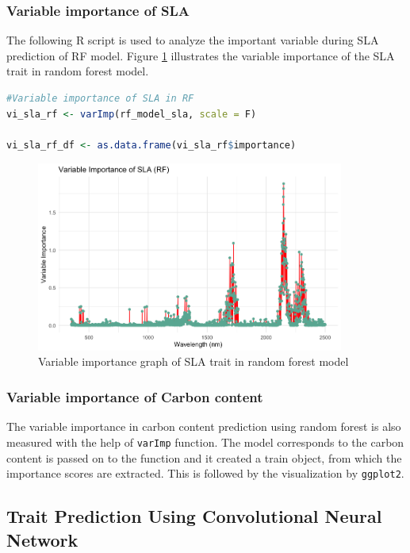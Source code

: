 \documentclass[12pt,a4paper]{report}
\begin{document}
\subsubsection*{Variable importance of SLA}
The following R script is used to analyze the important variable during SLA prediction of RF model. Figure \ref{fig:vi_sla_rf} illustrates the variable importance of the SLA trait in random forest model. \\

\begin{lstlisting}[language=R, style=mystyle]
#Variable importance of SLA in RF
vi_sla_rf <- varImp(rf_model_sla, scale = F)

vi_sla_rf_df <- as.data.frame(vi_sla_rf$importance)
\end{lstlisting}

\begin{figure}[h]
    \centering
    \includegraphics[width=0.9\textwidth]{Figures/vi_sla_rf.png}
    \caption{Variable importance graph of SLA trait in random forest model}
    \label{fig:vi_sla_rf}
\end{figure}

\subsubsection*{Variable importance of Carbon content}
The variable importance in carbon content prediction using random forest is also measured with the help of \texttt{varImp} function. The model corresponds to the carbon content is passed on to the function and it created a train object, from which the importance scores are extracted. This is followed by the visualization by \texttt{ggplot2}.\\

\subsection{Trait Prediction Using Convolutional Neural Network}
\end{document}

